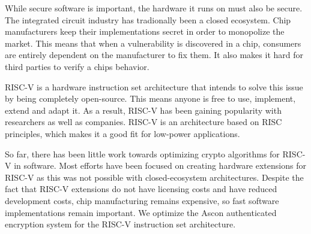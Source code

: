 While secure software is important, the hardware it runs on must also be secure.
The integrated circuit industry has tradionally been a closed ecosystem. Chip
manufacturers keep their implementations secret in order to monopolize the
market. This means that when a vulnerability is discovered in a chip, consumers
are entirely dependent on the manufacturer to fix them. It also makes it hard
for third parties to verify a chips behavior.

RISC-V is a hardware instruction set architecture that intends to solve this
issue by being completely open-source. This means anyone is free to use,
implement, extend and adapt it. As a result, RISC-V has been gaining popularity
with researchers as well as companies. RISC-V is an architecture based on RISC
principles, which makes it a good fit for low-power applications.

So far, there has been little work towards optimizing crypto algorithms for
RISC-V in software. Most efforts have been focused on creating hardware
extensions for RISC-V as this was not possible with closed-ecosystem
architectures. Despite the fact that RISC-V extensions do not have licensing
costs and have reduced development costs, chip manufacturing remains expensive,
so fast software implementations remain important. We optimize the Ascon
authenticated encryption system for the RISC-V instruction set architecture.
